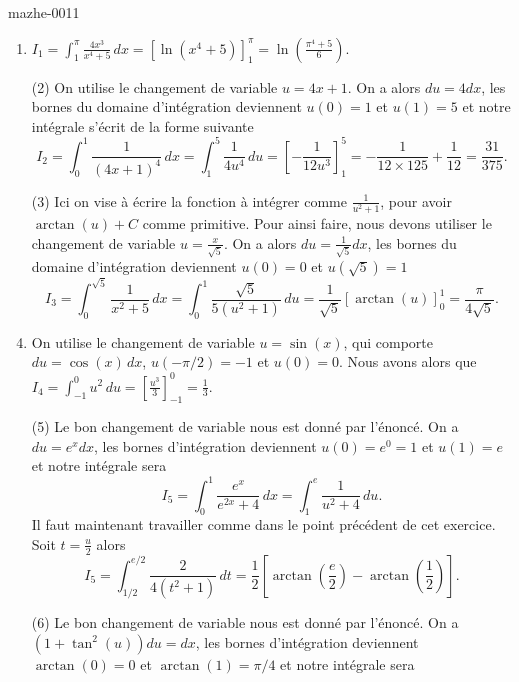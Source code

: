 
\begin{corrige}{mazhe-0011}
  \begin{enumerate}
 \item $I_{1}=\displaystyle \int_{1}^{\pi} \frac{4x^3}{x^4+5}\, dx = \left[\ln(x^4+5)\right]_1^\pi = \ln\left(\frac{\pi^4+5}{6}\right)$.
  \item[(2)] On utilise le changement de variable $u =4x+1 $. On a alors $du = 4 dx$, les bornes du domaine d'intégration deviennent $u(0) = 1$ et $u(1) =5$ et notre intégrale s'écrit de la forme suivante
    \[
    I_{2}=\int_{0}^{1}\frac{1}{(4x+1)^4}\, dx =\int_{1}^{5}\frac{1}{4u^4}\, du = \left[-\frac{1}{12u^3}\right]_1^5 = -\frac{1}{12\times 125} + \frac{1}{12} = \frac{31}{375}.
    \]
  \item[(3)] Ici on vise à écrire la fonction à intégrer comme $\frac{1}{u^2 + 1}$, pour avoir $\arctan(u) + C$ comme primitive. Pour ainsi faire, nous devons utiliser le changement de variable $u= \frac{x}{\sqrt{5}}$. On a alors $du = \frac{1}{\sqrt{5}} dx$, les bornes du domaine d'intégration deviennent $u(0) = 0$ et $u(\sqrt{5}) =1$ 
    \[
    I_{3}=\int_{0}^{\sqrt{5}}\frac{1}{x^2+5}\, dx = \int_{0}^{1}\frac{\sqrt{5}}{5(u^2+1)}\, du = \frac{1}{\sqrt{5}} [\arctan(u)]_0^1 = \frac{\pi}{4\sqrt{5}}.
    \]
  \item On utilise le changement de variable $u = \sin(x)$, qui comporte $du = \cos(x)\,dx$,  $u(-\pi/2) = -1$ et  $u(0) = 0$. Nous avons alors que  $I_{4}=\displaystyle \int_{-1}^{0} u^2\, du = \left[\frac{u^3}{3}\right]_{-1}^0= \frac{1}{3}$.
  \item[(5)] Le bon changement de variable nous est donné par l'énoncé. On a $du= e^x dx$, les bornes d'intégration deviennent $u(0) = e^0=1$ et $u(1) = e$ et notre intégrale sera 
    \[
    I_{5}=\int_{0}^{1}\frac{e^x}{e^{2x}+4} \, dx =\int_{1}^{e}\frac{1}{u^2+4} \, du. 
    \] 
    Il faut maintenant travailler comme dans le point précédent de cet exercice. Soit $t =\frac{u}{2}$ alors 
    \[
    I_{5}=\int_{1/2}^{e/2}\frac{2}{4(t^2+1)} \, dt = \frac{1}{2} \left[\arctan\left(\frac{e}{2}\right) - \arctan\left(\frac{1}{2}\right)\right].  
    \] 
 \item[(6)] Le bon changement de variable nous est donné par l'énoncé. On a $ (1 + \tan^2(u))du= dx$, les bornes d'intégration deviennent $\arctan(0) = 0$ et $\arctan(1) = \pi/4$ et notre intégrale sera 

\end{enumerate}
\end{corrige}
